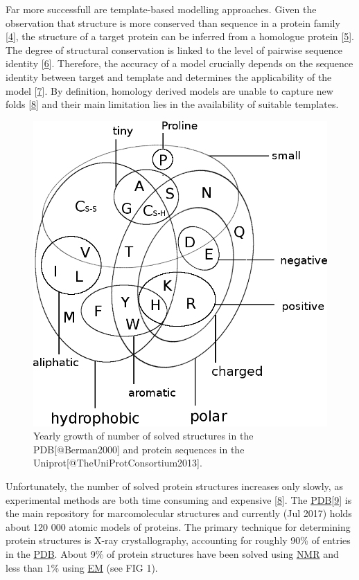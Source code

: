 \documentclass[12pt,a4paper,twoside]{book}
\theoremstyle{definition}
\theoremstyle{definition}
\theoremstyle{remark}
\begin{document}
Far more successfull are template-based modelling approaches. Given the
observation that structure is more conserved than sequence in a protein
family {[}\protect\hyperlink{ref-Lesk1980}{4}{]}, the structure of a
target protein can be inferred from a homologue protein
{[}\protect\hyperlink{ref-Sander1991}{5}{]}. The degree of structural
conservation is linked to the level of pairwise sequence identity
{[}\protect\hyperlink{ref-Chothia1986}{6}{]}. Therefore, the accuracy of
a model crucially depends on the sequence identity between target and
template and determines the applicability of the model
{[}\protect\hyperlink{ref-Marti-Renom2000}{7}{]}. By definition,
homology derived models are unable to capture new folds
{[}\protect\hyperlink{ref-Dorn2014}{8}{]} and their main limitation lies
in the availability of suitable templates.

\begin{figure}
\includegraphics[width=1\linewidth]{img/amino_acid_physico_chemical_properties_venn_diagramm} \caption{Yearly growth of number of solved structures in the PDB[@Berman2000] and protein sequences in the Uniprot[@TheUniProtConsortium2013].}\label{fig:seq-str-gap}
\end{figure}

Unfortunately, the number of solved protein structures increases only
slowly, as experimental methods are both time consuming and expensive
{[}\protect\hyperlink{ref-Dorn2014}{8}{]}. The
\protect\hyperlink{abbrev}{PDB}{[}\protect\hyperlink{ref-Berman2000}{9}{]}
is the main repository for marcomolecular structures and currently (Jul
2017) holds about 120 000 atomic models of proteins. The primary
technique for determining protein structures is X-ray crystallography,
accounting for roughly 90\% of entries in the
\protect\hyperlink{abbrev}{PDB}. About 9\% of protein structures have
been solved using \protect\hyperlink{abbrev}{NMR} and less than 1\%
using \protect\hyperlink{abbrev}{EM} (see FIG 1).
\end{document}
